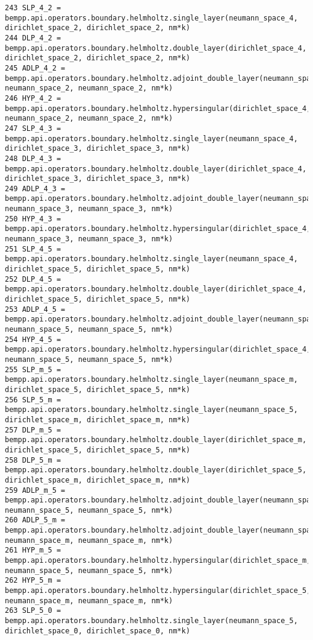 \documentclass[12pt,letterpaper]{article}
\numberwithin{equation}{section}
\begin{document}
\begin{lstlisting}
243 SLP_4_2 = bempp.api.operators.boundary.helmholtz.single_layer(neumann_space_4, dirichlet_space_2, dirichlet_space_2, nm*k)
244 DLP_4_2 = bempp.api.operators.boundary.helmholtz.double_layer(dirichlet_space_4, dirichlet_space_2, dirichlet_space_2, nm*k)
245 ADLP_4_2 = bempp.api.operators.boundary.helmholtz.adjoint_double_layer(neumann_space_4, neumann_space_2, neumann_space_2, nm*k)
246 HYP_4_2 = bempp.api.operators.boundary.helmholtz.hypersingular(dirichlet_space_4, neumann_space_2, neumann_space_2, nm*k)
247 SLP_4_3 = bempp.api.operators.boundary.helmholtz.single_layer(neumann_space_4, dirichlet_space_3, dirichlet_space_3, nm*k)
248 DLP_4_3 = bempp.api.operators.boundary.helmholtz.double_layer(dirichlet_space_4, dirichlet_space_3, dirichlet_space_3, nm*k)
249 ADLP_4_3 = bempp.api.operators.boundary.helmholtz.adjoint_double_layer(neumann_space_4, neumann_space_3, neumann_space_3, nm*k)
250 HYP_4_3 = bempp.api.operators.boundary.helmholtz.hypersingular(dirichlet_space_4, neumann_space_3, neumann_space_3, nm*k)
251 SLP_4_5 = bempp.api.operators.boundary.helmholtz.single_layer(neumann_space_4, dirichlet_space_5, dirichlet_space_5, nm*k)
252 DLP_4_5 = bempp.api.operators.boundary.helmholtz.double_layer(dirichlet_space_4, dirichlet_space_5, dirichlet_space_5, nm*k)
253 ADLP_4_5 = bempp.api.operators.boundary.helmholtz.adjoint_double_layer(neumann_space_4, neumann_space_5, neumann_space_5, nm*k)
254 HYP_4_5 = bempp.api.operators.boundary.helmholtz.hypersingular(dirichlet_space_4, neumann_space_5, neumann_space_5, nm*k)
255 SLP_m_5 = bempp.api.operators.boundary.helmholtz.single_layer(neumann_space_m, dirichlet_space_5, dirichlet_space_5, nm*k)
256 SLP_5_m = bempp.api.operators.boundary.helmholtz.single_layer(neumann_space_5, dirichlet_space_m, dirichlet_space_m, nm*k)
257 DLP_m_5 = bempp.api.operators.boundary.helmholtz.double_layer(dirichlet_space_m, dirichlet_space_5, dirichlet_space_5, nm*k)
258 DLP_5_m = bempp.api.operators.boundary.helmholtz.double_layer(dirichlet_space_5, dirichlet_space_m, dirichlet_space_m, nm*k)
259 ADLP_m_5 = bempp.api.operators.boundary.helmholtz.adjoint_double_layer(neumann_space_m, neumann_space_5, neumann_space_5, nm*k)
260 ADLP_5_m = bempp.api.operators.boundary.helmholtz.adjoint_double_layer(neumann_space_5, neumann_space_m, neumann_space_m, nm*k)
261 HYP_m_5 = bempp.api.operators.boundary.helmholtz.hypersingular(dirichlet_space_m, neumann_space_5, neumann_space_5, nm*k)
262 HYP_5_m = bempp.api.operators.boundary.helmholtz.hypersingular(dirichlet_space_5, neumann_space_m, neumann_space_m, nm*k)
263 SLP_5_0 = bempp.api.operators.boundary.helmholtz.single_layer(neumann_space_5, dirichlet_space_0, dirichlet_space_0, nm*k)

\end{lstlisting}
\end{document}
